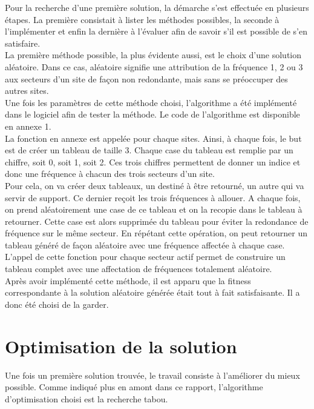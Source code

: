 \documentclass[a4paper, 11pt]{report}
\begin{document}
	Pour la recherche d'une première solution, la démarche s'est effectuée en plusieurs étapes. La première consistait à lister les méthodes possibles, la seconde à l'implémenter et enfin la dernière à l'évaluer afin de savoir s'il est possible de s'en satisfaire.\\
	La première méthode possible, la plus évidente aussi, est le choix d'une solution aléatoire. Dans ce cas, aléatoire signifie une attribution de la fréquence 1, 2 ou 3 aux secteurs d'un site de façon non redondante, mais sans se préoccuper des autres sites.\\
	Une fois les paramètres de cette méthode choisi, l'algorithme a été implémenté dans le logiciel afin de tester la méthode. Le code de l'algorithme est disponible en annexe 1.\\
	La fonction en annexe est appelée pour chaque sites. Ainsi, à chaque fois, le but est de créer un tableau de taille 3. Chaque case du tableau est remplie par un chiffre, soit 0, soit 1, soit 2. Ces trois chiffres permettent de donner un indice et donc une fréquence à chacun des trois secteurs d'un site.\\
	Pour cela, on va créer deux tableaux, un destiné à être retourné, un autre qui va servir de support. Ce dernier reçoit les trois fréquences à allouer. A chaque fois, on prend aléatoirement une case de ce tableau et on la recopie dans le tableau à retourner.  Cette case est alors supprimée du tableau pour éviter la redondance de fréquence sur le même secteur. En répétant cette opération, on peut retourner un tableau généré de façon aléatoire avec une fréquence affectée à chaque case.\\
	L'appel de cette fonction pour chaque secteur actif permet de construire un tableau complet avec une affectation de fréquences totalement aléatoire.\\
	Après avoir implémenté cette méthode, il est apparu que la fitness correspondante à la solution aléatoire générée était tout à fait satisfaisante. Il a donc été choisi de la garder.
	
	\section{Optimisation de la solution}
	
	Une fois un première solution trouvée, le travail consiste à l'améliorer du mieux possible. Comme indiqué plus en amont dans ce rapport, l'algorithme d'optimisation choisi est la recherche tabou.
	
	
\end{document}
